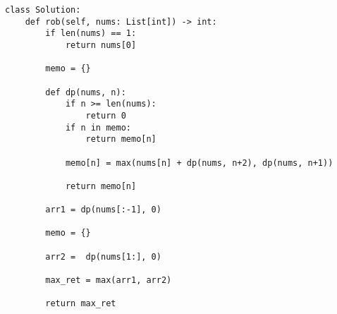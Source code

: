 \documentclass[24pt, a4]{article}
\begin{document}
\begin{lstlisting}
class Solution:
    def rob(self, nums: List[int]) -> int:
        if len(nums) == 1:
            return nums[0]
        
        memo = {}
        
        def dp(nums, n):
            if n >= len(nums):
                return 0
            if n in memo:
                return memo[n]
            
            memo[n] = max(nums[n] + dp(nums, n+2), dp(nums, n+1))
            
            return memo[n]
        
        arr1 = dp(nums[:-1], 0)
        
        memo = {}
        
        arr2 =  dp(nums[1:], 0)
        
        max_ret = max(arr1, arr2)
        
        return max_ret
\end{lstlisting}
\end{document}
